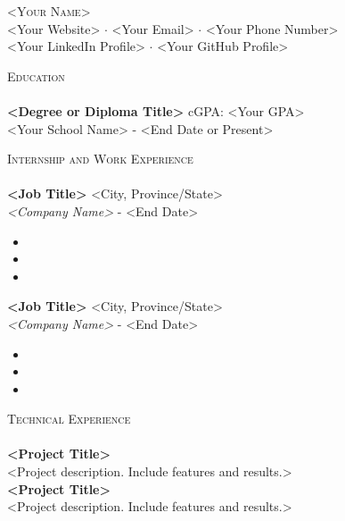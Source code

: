 \documentclass[a4paper]{article}
\newcommand{\lineunder} {
    \vspace*{-8pt} \\
    \hspace*{-18pt} \hrulefill \\
}
\newcommand{\header} [1] {
    {\hspace*{-18pt}\vspace*{6pt} \textsc{#1}}
    \vspace*{-6pt} \lineunder
}
\begin{document}
\vspace*{-40pt}

\vspace*{-10pt}
\begin{center}
    {\Huge \scshape {<Your Name>}}\\
    <Your Website> $\cdot$ <Your Email> $\cdot$ <Your Phone Number> \\
    <Your LinkedIn Profile> $\cdot$ <Your GitHub Profile>\\
\end{center}

\header{Education}
\textbf{<Degree or Diploma Title>} \hfill cGPA: <Your GPA>\\ 
<Your School Name>  - <End Date or Present>\\
\vspace{1mm}
\vspace{4mm}

\header{Internship and Work Experience}
\textbf{<Job Title>} \hfill <City, Province/State>\\
\textit{<Company Name>}  - <End Date>\\
\vspace{-1mm}
\begin{itemize} \itemsep 1pt
    \item <Achievement or responsibility 1>
    \item <Achievement or responsibility 2>
    \item <Achievement or responsibility 3>
\end{itemize}
\textbf{<Job Title>} \hfill <City, Province/State>\\
\textit{<Company Name>}  - <End Date>\\
\vspace{-1mm}
\begin{itemize} \itemsep 1pt
    \item <Achievement or responsibility 1>
    \item <Achievement or responsibility 2>
    \item <Achievement or responsibility 3>
\end{itemize}
\vspace{4mm}

\header{Technical Experience}
{\textbf{<Project Title>}} {\sl <Technologies Used>} \\
<Project description. Include features and results.>\\
\vspace*{3mm}
{\textbf{<Project Title>}} {\sl <Technologies Used>} \\
<Project description. Include features and results.>\\
\vspace*{4mm}
\end{document}
